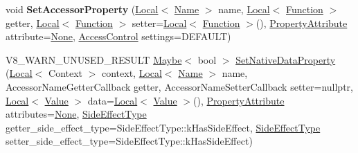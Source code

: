 \begin{DoxyCompactItemize}
\item 
\mbox{\label{classv8_1_1Object_a284911d760fc853d81adf98c242bc453}} 
void {\bfseries Set\+Accessor\+Property} (\mbox{\hyperlink{classv8_1_1Local}{Local}}$<$ \mbox{\hyperlink{classv8_1_1Name}{Name}} $>$ name, \mbox{\hyperlink{classv8_1_1Local}{Local}}$<$ \mbox{\hyperlink{classv8_1_1Function}{Function}} $>$ getter, \mbox{\hyperlink{classv8_1_1Local}{Local}}$<$ \mbox{\hyperlink{classv8_1_1Function}{Function}} $>$ setter=\mbox{\hyperlink{classv8_1_1Local}{Local}}$<$ \mbox{\hyperlink{classv8_1_1Function}{Function}} $>$(), \mbox{\hyperlink{namespacev8_a05f25f935e108a1ea2d150e274602b87}{Property\+Attribute}} attribute=\mbox{\hyperlink{namespacev8_a05f25f935e108a1ea2d150e274602b87a7ab4d58719c33b3ea2dfaefa29b111df}{None}}, \mbox{\hyperlink{namespacev8_a31d8355cb043d7d2dda3f4a52760b64e}{Access\+Control}} settings=D\+E\+F\+A\+U\+LT)
\item 
V8\+\_\+\+W\+A\+R\+N\+\_\+\+U\+N\+U\+S\+E\+D\+\_\+\+R\+E\+S\+U\+LT \mbox{\hyperlink{classv8_1_1Maybe}{Maybe}}$<$ bool $>$ \mbox{\hyperlink{classv8_1_1Object_ac5ff13d780196543799030ae25333e4d}{Set\+Native\+Data\+Property}} (\mbox{\hyperlink{classv8_1_1Local}{Local}}$<$ Context $>$ context, \mbox{\hyperlink{classv8_1_1Local}{Local}}$<$ \mbox{\hyperlink{classv8_1_1Name}{Name}} $>$ name, Accessor\+Name\+Getter\+Callback getter, Accessor\+Name\+Setter\+Callback setter=nullptr, \mbox{\hyperlink{classv8_1_1Local}{Local}}$<$ \mbox{\hyperlink{classv8_1_1Value}{Value}} $>$ data=\mbox{\hyperlink{classv8_1_1Local}{Local}}$<$ \mbox{\hyperlink{classv8_1_1Value}{Value}} $>$(), \mbox{\hyperlink{namespacev8_a05f25f935e108a1ea2d150e274602b87}{Property\+Attribute}} attributes=\mbox{\hyperlink{namespacev8_a05f25f935e108a1ea2d150e274602b87a7ab4d58719c33b3ea2dfaefa29b111df}{None}}, \mbox{\hyperlink{namespacev8_a29711319c2b9fc7716d65faee2f7b9cb}{Side\+Effect\+Type}} getter\+\_\+side\+\_\+effect\+\_\+type=Side\+Effect\+Type\+::k\+Has\+Side\+Effect, \mbox{\hyperlink{namespacev8_a29711319c2b9fc7716d65faee2f7b9cb}{Side\+Effect\+Type}} setter\+\_\+side\+\_\+effect\+\_\+type=Side\+Effect\+Type\+::k\+Has\+Side\+Effect)
\item 

\end{DoxyCompactItemize}
